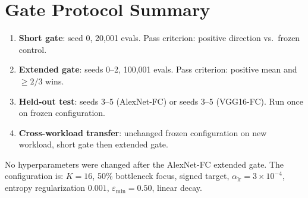 \documentclass[10pt,conference]{IEEEtran}
\begin{document}
\section{Gate Protocol Summary}
\label{app:gates}

\begin{enumerate}
  \item \textbf{Short gate}: seed 0, 20,001 evals.  Pass criterion: positive
        direction vs.\ frozen control.
  \item \textbf{Extended gate}: seeds 0--2, 100,001 evals.  Pass criterion:
        positive mean and $\geq 2/3$ wins.
  \item \textbf{Held-out test}: seeds 3--5 (AlexNet-FC) or seeds 3--5
        (VGG16-FC).  Run once on frozen configuration.
  \item \textbf{Cross-workload transfer}: unchanged frozen configuration on new
        workload, short gate then extended gate.
\end{enumerate}

No hyperparameters were changed after the AlexNet-FC extended gate.  The
configuration is: $K=16$, 50\% bottleneck focus, signed target, $\alpha_{\text{lr}}=3{\times}10^{-4}$,
entropy regularization $0.001$, $\varepsilon_{\min}=0.50$, linear decay.
\end{document}
